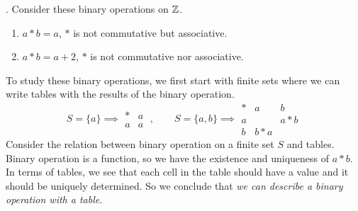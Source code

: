 \ex. Consider these binary operations on \(\mathbb{Z}\).
\begin{enumerate}
    \item \(a \ast b = a\), \(\ast\) is not commutative but associative.
    \item \(a \ast b = a + 2\), \(\ast\) is not commutative nor associative.
\end{enumerate}

\rmk To study these binary operations, we first start with finite sets where we can write tables with the results of the binary operation.
\[
    S = \{a\} \implies \begin{array}{c|c}
        \ast & a \\ \hline
        a    & a
    \end{array}\;,
    \qquad
    S = \{a, b\} \implies
    \begin{array}{c|c|c}
        \ast & a        & b     \\ \hline
        a    &          & a * b \\ \hline
        b    & b \ast a &
    \end{array}
\]
Consider the relation between binary operation on a finite set \(S\) and tables. Binary operation is a function, so we have the existence and uniqueness of \(a \ast b\). In terms of tables, we see that each cell in the table should have a value and it should be uniquely determined. So we conclude that \textit{we can describe a binary operation with a table}.

\pagebreak
